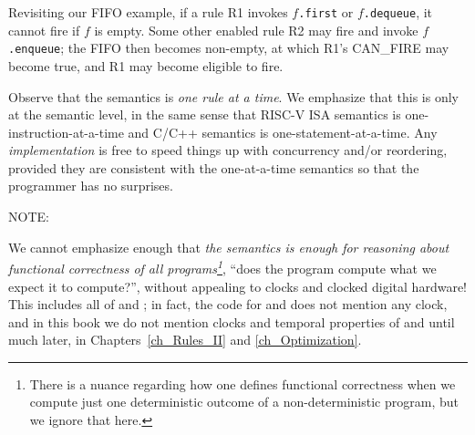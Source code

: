 Revisiting our FIFO example, if a rule R1 invokes $f$\verb|.first| or
$f$\verb|.dequeue|, it cannot fire if $f$ is empty.  Some other
enabled rule R2 may fire and invoke $f$\verb|.enqueue|; the FIFO then
becomes non-empty, at which R1's CAN\_FIRE may become true, and R1 may
become eligible to fire.

Observe that the semantics is \emph{one rule at a time}.  We emphasize
that this is only at the semantic level, in the same sense that RISC-V
ISA semantics is one-instruction-at-a-time and C/C++ semantics is
one-statement-at-a-time.  Any \emph{implementation} is free to speed
things up with concurrency and/or reordering, provided they are
consistent with the one-at-a-time semantics so that the programmer has
no surprises.

\vspace{2ex}

NOTE: 

\vspace{2ex}

We cannot emphasize enough that \emph{the semantics is enough for
reasoning about functional correctness of all {\BSV}
programs\footnote{There is a nuance regarding how one defines
functional correctness when we compute just one deterministic outcome
of a non-deterministic program, but we ignore that here.}}, {\ie}
``does the program compute what we expect it to compute?'', without
appealing to clocks and clocked digital hardware! This includes all of
{\DRUM} and {\FIFE}; in fact, the {\BSV} code for {\DRUM} and {\FIFE} does not
mention any clock, and in this book we do not mention clocks and
temporal properties of {\DRUM} and {\FIFE} until much later, in
Chapters~\ref{ch_Rules_II} and \ref{ch_Optimization}.

